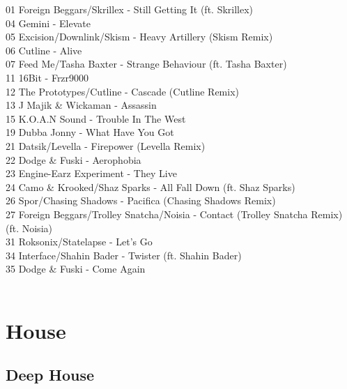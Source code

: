 \begin{multicols}{2}
 01 Foreign Beggars/Skrillex - Still Getting It (ft. Skrillex)\\ 04 Gemini - Elevate\\ 05 Excision/Downlink/Skism - Heavy Artillery (Skism Remix)\\ 06 Cutline - Alive\\ 07 Feed Me/Tasha Baxter - Strange Behaviour (ft. Tasha Baxter)\\ 11 16Bit - Frzr9000\\ 12 The Prototypes/Cutline - Cascade (Cutline Remix)\\ 13 J Majik \& Wickaman - Assassin\\ 15 K.O.A.N Sound - Trouble In The West\\ 19 Dubba Jonny - What Have You Got\\ 21 Datsik/Levella - Firepower (Levella Remix)\\ 22 Dodge \& Fuski - Aerophobia\\ 23 Engine-Earz Experiment - They Live\\ 24 Camo \& Krooked/Shaz Sparks - All Fall Down (ft. Shaz Sparks)\\ 26 Spor/Chasing Shadows - Pacifica (Chasing Shadows Remix)\\ 27 Foreign Beggars/Trolley Snatcha/Noisia - Contact (Trolley Snatcha Remix) (ft. Noisia)\\ 31 Roksonix/Statelapse - Let's Go\\ 34 Interface/Shahin Bader - Twister (ft. Shahin Bader)\\ 35 Dodge \& Fuski - Come Again\\
\\
\section*{House}
\subsection*{Deep House}

\end{multicols}
